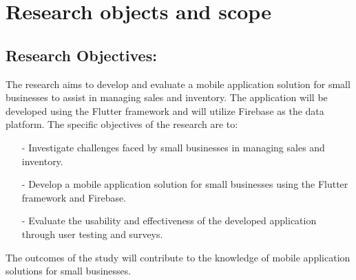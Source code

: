 \documentclass[../thesis.tex]{subfiles}
\begin{document}
\section{Research objects and scope}

\subsection{Research Objectives:}
% 

The research aims to develop and evaluate a mobile application solution for small businesses to assist in managing sales and inventory. The application will be developed using the Flutter framework and will utilize Firebase as the data platform. The specific objectives of the research are to:
\begin{itemize}
    \item[-] Investigate challenges faced by small businesses in managing sales and inventory.
    \item[-] Develop a mobile application solution for small businesses using the Flutter framework and Firebase.
    \item[-] Evaluate the usability and effectiveness of the developed application through user testing and surveys.    
\end{itemize}
The outcomes of the study will contribute to the knowledge of mobile application solutions for small businesses.
\end{document}
